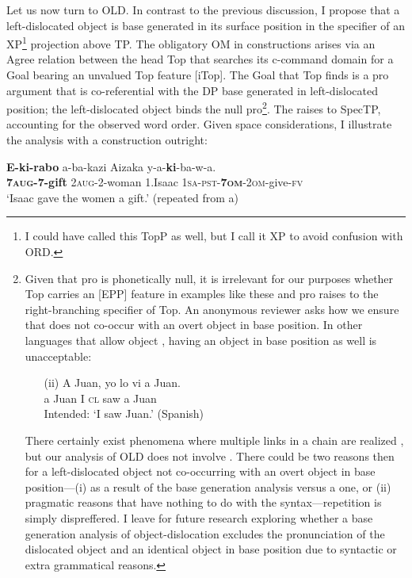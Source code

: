 \documentclass[output=paper
,newtxmath
,modfonts
,nonflat]{langsci/langscibook}
\begin{document}
\textup{Let us now turn to OLD. In contrast to the previous discussion, I propose that a left-dislocated object is base generated in its surface position in the specifier of an XP}\footnote{I could have called this TopP as well, but I call it XP to avoid confusion with ORD.} \textup{projection above TP. The obligatory OM in  constructions arises via an Agree relation between the head Top that searches its c-command domain for a Goal bearing an unvalued Top feature [iTop]. The Goal that Top finds is a} pro \textup{argument that is co-referential with the DP base generated in left-dislocated position; the left-dislocated object binds the null} pro\footnote{Given that pro is phonetically null, it is irrelevant for our purposes whether Top carries an [EPP] feature in examples like these and pro raises to the right-branching specifier of Top. An anonymous reviewer asks how we ensure that  does not co-occur with an overt object in base position. In other languages that allow object , having an object in base position as well is unacceptable:
\begin{enumerate}
	\item[(ii)] \gll  *A Juan, yo lo  vi     a Juan. \\
	 a  Juan  I    \textsc{cl} saw a Juan \\
	 \glt  Intended: ‘I saw Juan.’ (Spanish)
\end{enumerate}   There certainly exist phenomena where multiple links in a chain are realized \citep{Nunes2004}, but our analysis of OLD does not involve . There could be two reasons then for a left-dislocated object not co-occurring with an overt object in base position—(i) as a result of the base generation analysis versus a  one, or (ii) pragmatic reasons that have nothing to do with the syntax—repetition is simply dispreffered. I leave for future research exploring whether a base generation analysis of object-dislocation excludes the pronunciation of the dislocated object and an identical object in base position due to syntactic or extra grammatical reasons.}\textup{. The  raises to SpecTP, accounting for the observed word order. Given space considerations, I illustrate the analysis with a  construction outright:}


\ea\label{ex:ranero:32}
\gll \textbf{E-ki-rabo} a-ba-kazi           Aizaka y-a-\textbf{ki}{}-ba{}-w-a.\\
\textbf{7\textsc{aug}}\textbf{{}-7-gift} 2\textsc{aug}{}-2-woman 1.Isaac \textsc{1sa-pst-}\textbf{\textsc{7om}}\textsc{{}-}\textsc{2om}{}-give-\textsc{fv}\\
\glt ‘Isaac gave the women a gift.’ (repeated from a)
\end{document}
